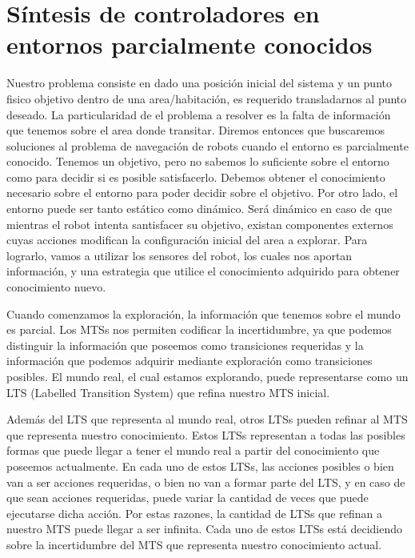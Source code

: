 \chapter{Síntesis de controladores en entornos parcialmente conocidos}

Nuestro problema consiste en dado una posición inicial del sistema y un punto 
fisico objetivo dentro de una area/habitación, es requerido transladarnos al 
punto deseado. La particularidad de el problema a resolver es la falta de 
información que tenemos sobre el area donde transitar. Diremos entonces que 
buscaremos soluciones al problema de navegación de robots cuando el entorno es 
parcialmente conocido.
Tenemos un objetivo, pero no sabemos lo suficiente sobre el entorno como para 
decidir si es 
posible satisfacerlo. Debemos obtener el conocimiento necesario sobre el 
entorno para poder decidir sobre el objetivo. 
Por otro lado, el entorno puede ser tanto estático como dinámico. Será dinámico 
en caso de que mientras el robot intenta santisfacer su objetivo, existan 
componentes externos cuyas acciones modifican la configuración inicial del area 
a explorar.
Para lograrlo, vamos a utilizar los sensores del robot, los cuales nos aportan 
información, y una estrategia que 
utilice el conocimiento adquirido para obtener conocimiento nuevo.

Cuando comenzamos la exploración, la información que tenemos sobre el mundo es 
parcial. Los MTSs nos permiten codificar
la incertidumbre, ya que podemos distinguir la información que poseemos como 
transiciones requeridas y la información
que podemos adquirir mediante exploración como transiciones posibles. El mundo 
real, el cual estamos explorando, puede 
representarse como un LTS (Labelled Transition System) que refina nuestro MTS 
inicial.

Además del LTS que representa al mundo real, otros LTSs pueden refinar al MTS 
que representa nuestro conocimiento. Estos
LTSs representan a todas las posibles formas que puede llegar a tener el mundo 
real a partir del conocimiento que poseemos
actualmente. En cada uno de estos LTSs, las acciones posibles o bien van a ser 
acciones requeridas, o bien no van a formar
parte del LTS, y en caso de que sean acciones requeridas, puede variar la 
cantidad de veces que puede ejecutarse dicha acción.
Por estas razones, la cantidad de LTSs que refinan a nuestro MTS puede llegar a 
ser infinita. Cada uno de estos LTSs está
decidiendo sobre la incertidumbre del MTS que representa nuestro conocimiento 
actual.

